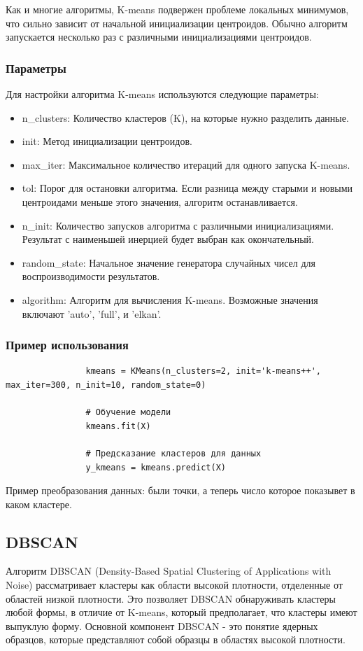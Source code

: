 			Как и многие алгоритмы, K-means подвержен проблеме локальных минимумов, что сильно зависит от начальной инициализации центроидов. Обычно алгоритм запускается несколько раз с различными инициализациями центроидов.
			
		\subsubsection{Параметры}
			Для настройки алгоритма K-means используются следующие параметры:
			\begin{itemize}
				\item n\_clusters: Количество кластеров (K), на которые нужно разделить данные.
				\item init: Метод инициализации центроидов.
				\item max\_iter: Максимальное количество итераций для одного запуска K-means.
				\item tol: Порог для остановки алгоритма. Если разница между старыми и новыми центроидами меньше этого значения, алгоритм останавливается.
				\item n\_init: Количество запусков алгоритма с различными инициализациями. Результат с наименьшей инерцией будет выбран как окончательный.
				\item random\_state: Начальное значение генератора случайных чисел для воспроизводимости результатов.
				\item algorithm: Алгоритм для вычисления K-means. Возможные значения включают 'auto', 'full', и 'elkan'.
			\end{itemize}
			
		\subsubsection{Пример использования}
			\begin{verbatim}
				kmeans = KMeans(n_clusters=2, init='k-means++', max_iter=300, n_init=10, random_state=0)

				# Обучение модели
				kmeans.fit(X)

				# Предсказание кластеров для данных
				y_kmeans = kmeans.predict(X)
			\end{verbatim}
			
			
			Пример преобразования данных:
				были точки, а теперь число которое показывет в каком кластере.
	  
	\subsection{DBSCAN}
		Алгоритм DBSCAN (Density-Based Spatial Clustering of Applications with Noise) рассматривает кластеры как области высокой плотности, отделенные от областей низкой плотности. Это позволяет DBSCAN обнаруживать кластеры любой формы, в отличие от K-means, который предполагает, что кластеры имеют выпуклую форму. Основной компонент DBSCAN - это понятие ядерных образцов, которые представляют собой образцы в областях высокой плотности.
		
